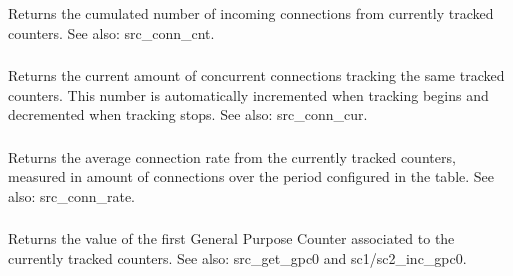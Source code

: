 \subsubsection[sc1\_conn\_cnt]{}
\subsubsection[sc2\_conn\_cnt]{}
  Returns the cumulated number of incoming connections from currently tracked
  counters. See also: src\_conn\_cnt.

\subsubsection[sc1\_conn\_cur]{}
\subsubsection[sc2\_conn\_cur]{}
  Returns the current amount of concurrent connections tracking the same
  tracked counters. This number is automatically incremented when tracking
  begins and decremented when tracking stops. See also: src\_conn\_cur.

\subsubsection[sc1\_conn\_rate]{}
\subsubsection[sc2\_conn\_rate]{}
  Returns the average connection rate from the currently tracked counters,
  measured in amount of connections over the period configured in the table.
  See also: src\_conn\_rate.

\subsubsection[sc1\_get\_gpc0]{}
\subsubsection[sc2\_get\_gpc0]{}
  Returns the value of the first General Purpose Counter associated to the
  currently tracked counters. See also: src\_get\_gpc0 and sc1/sc2\_inc\_gpc0.

